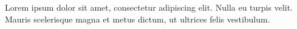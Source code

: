 \documentclass{article}
\begin{document}
Lorem ipsum dolor sit amet, consectetur adipiscing elit. Nulla eu turpis velit. Mauris scelerisque magna et metus dictum,  ut ultrices felis vestibulum.
\end{document}
